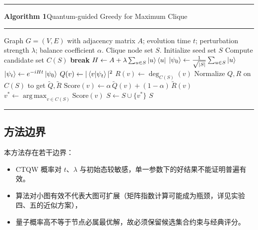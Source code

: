 \documentclass[pre,twocolumn]{revtex4-2}
\DeclareMathOperator*{\argmax}{arg\,max}
\begin{document}
\par\vspace{1ex}\noindent\rule{\columnwidth}{0.8pt}\par\vspace{-0.3ex}
\noindent\textbf{Algorithm 1}\quad Quantum-guided Greedy for Maximum Clique
\par\vspace{-0.3ex}\noindent\rule{\columnwidth}{0.4pt}\par\vspace{0.3ex}
\begin{algorithmic}[1]
\Require Graph $G=(V,E)$ with adjacency matrix $A$; evolution time $t$; perturbation strength $\lambda$; balance coefficient $\alpha$.
\Ensure Clique node set $S$.
\State Initialize seed set $S$
    \State Compute candidate set $C(S)$
        \State \textbf{break}
    \EndIf
    \State $H \gets A + \lambda \sum_{u \in S}\ket{u}\bra{u}$ 
    \State $\ket{\psi_0} \gets \tfrac{1}{\sqrt{|S|}}\sum_{u \in S}\ket{u}$
    \State $\ket{\psi_t} \gets e^{-iHt}\ket{\psi_0}$ 
        \State $Q(v) \gets |\braket{v|\psi_t}|^2$ 
        \State $R(v) \gets \deg_{C(S)}(v)$ 
    \EndFor
    \State Normalize $Q,R$ on $C(S)$ to get $\widetilde{Q},\widetilde{R}$
    \State $\mathrm{Score}(v) \gets \alpha\,\widetilde{Q}(v) + (1-\alpha)\,\widetilde{R}(v)$
    \State $v^* \gets \argmax_{v \in C(S)} \mathrm{Score}(v)$
    \State $S \gets S \cup \{v^*\}$
\EndWhile
\State \Return $S$
\end{algorithmic}
\par\vspace{0.3ex}\noindent\rule{\columnwidth}{0.8pt}\par\vspace{1ex}

\subsection{方法边界}
本方法存在若干边界：
\begin{itemize}
    \item CTQW 概率对 $t$、$\lambda$ 与初始态较敏感，单一参数下的好结果不能证明普遍有效。
    \item 算法对小图有效不代表大图可扩展（矩阵指数计算可能成为瓶颈，详见实验四、五的近似方案），
    \item 量子概率高不等于节点必属最优解，故必须保留候选集合约束与经典评分。
\end{itemize}
\end{document}
